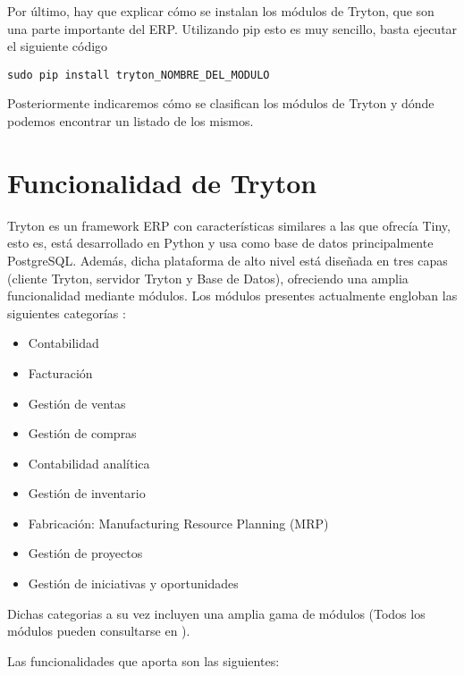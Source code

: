\documentclass{article}
\begin{document}
Por último, hay que explicar cómo se instalan los módulos de Tryton, que son una parte importante del ERP. Utilizando pip esto es muy sencillo, basta ejecutar el siguiente código

\begin{verbatim}
sudo pip install tryton_NOMBRE_DEL_MODULO
\end{verbatim}

Posteriormente indicaremos cómo se clasifican los módulos de Tryton y dónde podemos encontrar un listado de los mismos.



\section{Funcionalidad de Tryton}

Tryton es un framework ERP con características similares a las que ofrecía Tiny, esto es, está desarrollado en Python y usa como base de datos principalmente PostgreSQL. Además, dicha plataforma de alto nivel está diseñada en tres capas (cliente Tryton, servidor Tryton y Base de Datos), ofreciendo una amplia funcionalidad mediante módulos. Los módulos presentes actualmente engloban las siguientes categorías \cite{tryton}:

\begin{itemize}
    \item Contabilidad
    \item Facturación
    \item Gestión de ventas
    \item Gestión de compras
    \item Contabilidad analítica
    \item Gestión de inventario
    \item Fabricación: Manufacturing Resource Planning (MRP)
    \item Gestión de proyectos
    \item Gestión de iniciativas y oportunidades
\end{itemize}

Dichas categorias a su vez incluyen una amplia gama de módulos (Todos los módulos pueden consultarse en \cite{modulos}).

Las funcionalidades que aporta son las siguientes:
\end{document}
